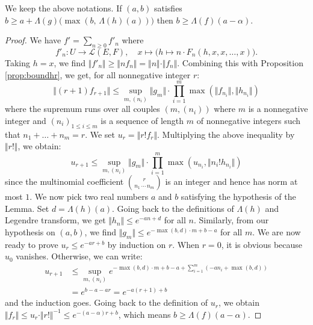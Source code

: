 \documentclass{sig-alternate}
\begin{document}
\begin{lem}
\label{lem:boundLambdaf}
We keep the above notations. 
If $(a,b)$ satisfies
$b \geq a + \Lambda(g)\big( \! \max(b, \, \Lambda(h) (a)) \big)$
then $b \geq \Lambda(f)(a - \alpha)$.
\end{lem}

\begin{proof}
We have $f' = \sum_{n \geq 0} f'_n$ where
$$f'_n : U \to \mathcal L(E,F), \quad
x \mapsto \big(h \mapsto n \cdot F_n(h, x, x, \ldots, x)\big).$$
Taking $h = x$, we find
$\Vert f'_n \Vert \geq \Vert n f_n \Vert = 
\Vert n \Vert \cdot \Vert f_n \Vert$.
Combining this with Proposition \ref{prop:boundhr}, we get, for all
nonnegative integer $r$:
$$\Vert (r+1) f_{r+1} \Vert \leq
  \sup_{m, (n_i)} \Vert g_m \Vert \cdot 
  \prod_{i=1}^m \max(\Vert f_{n_i} \Vert, \Vert h_{n_i} \Vert)$$
where the supremum runs over all couples $(m, (n_i))$ where $m$
is a nonnegative integer and $(n_i)_{1 \leq i \leq m}$ is a sequence of
length $m$ of nonnegative integers such that $n_1 + \ldots + n_m = r$.
We set $u_r = \Vert r! f_r \Vert$. Multiplying the above inequality by
$\Vert r! \Vert$, we obtain:
\begin{equation}
\label{eq:boundurrec}
u_{r+1} \leq
  \sup_{m, (n_i)} \Vert g_m \Vert \cdot 
  \prod_{i=1}^m \max(u_{n_i}, \Vert n_i! h_{n_i} \Vert)
\end{equation}
since the multinomial coefficient $\binom r {\!n_1 \, \cdots \, n_m\!}$
is an integer and hence has norm at most $1$.
We now pick two real numbers $a$ and $b$ satisfying the hypothesis of 
the Lemma. Set $d = \Lambda(h)(a)$. Going back to the definitions of 
$\Lambda (h)$ and Legendre transform, we get $\Vert h_n \Vert \leq e^{- 
a n + d}$ for all $n$.
Similarly, from our hypothesis on $(a,b)$, we find
$\Vert g_m \Vert \leq e^{-\!\max(b,d)\cdot m + b - a}$ for all $m$.
We are now ready to prove $u_r \leq e^{-ar + b}$ by induction on $r$.
When $r = 0$, it is obvious because $u_0$ vanishes. Otherwise, we 
can write:
\begin{align*}
u_{r+1} 
& \leq \sup_{m, (n_i)}
    e^{ -\max(b,d)\cdot m + b - a + \sum_{i=1}^m (-a n_i + \max(b,d))} \\
& = e^{ b - a - a r } = e^{ -a (r+1) + b}
\end{align*}
and the induction goes. Going back to the definition of $u_r$, we obtain 
$\Vert f_r \Vert \leq u_r \cdot \Vert r! \Vert^{-1} \leq e^{-(a - \alpha) 
r + b}$, which means $b \geq \Lambda(f)(a - \alpha)$.
\end{proof}
\end{document}
